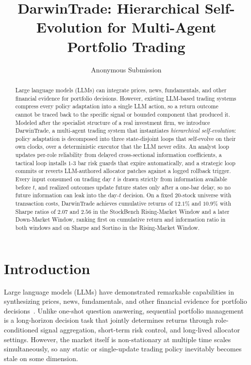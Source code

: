 \documentclass[letterpaper]{article}
\title{DarwinTrade: Hierarchical Self-Evolution for Multi-Agent Portfolio Trading}
\author{
    Anonymous Submission
}
\begin{document}
\maketitle

\begin{abstract}
Large language models (LLMs) can integrate prices, news, fundamentals, and
other financial evidence for portfolio decisions. However, existing
LLM-based trading systems compress every policy adaptation into a single
LLM action, so a return outcome cannot be traced back to the specific
signal or bounded component that produced it. Modeled after the specialist
structure of a real investment firm, we introduce DarwinTrade, a
multi-agent trading system that instantiates \emph{hierarchical
self-evolution}: policy adaptation is decomposed into three
state-disjoint loops that self-evolve on their own clocks, over a
deterministic executor that the LLM never edits. An analyst loop updates
per-role reliability from delayed cross-sectional information
coefficients, a tactical loop installs $1$-$3$ bar risk guards that
expire automatically, and a strategic loop commits or reverts
LLM-authored allocator patches against a logged rollback trigger. Every
input consumed on trading day $t$ is drawn strictly from information
available before $t$, and realized outcomes update future states only
after a one-bar delay, so no future information can leak into the
day-$t$ decision. On a fixed $20$-stock universe with transaction costs,
DarwinTrade achieves cumulative returns of $12.1\%$ and $10.9\%$ with
Sharpe ratios of $2.07$ and $2.56$ in the StockBench Rising-Market
Window and a later Down-Market Window, ranking first on cumulative
return and information ratio in both windows and on Sharpe and Sortino
in the Rising-Market Window.
\end{abstract}

\section{Introduction}

Large language models (LLMs) have demonstrated remarkable capabilities in
synthesizing prices, news, fundamentals, and other financial evidence for
portfolio decisions~\citep{zhang2024finagent,liu2025finpos,rashid2026finanalyst}.
Unlike one-shot question answering, sequential portfolio management is a
long-horizon decision task that jointly determines returns through
role-conditioned signal aggregation, short-term risk control, and long-lived
allocator settings. However, the market itself is non-stationary at multiple
time scales simultaneously, so any static or single-update trading policy
inevitably becomes stale on some dimension.
\end{document}
